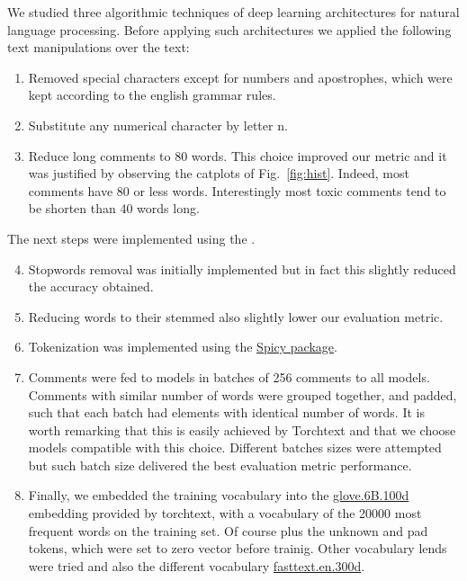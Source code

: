 \documentclass{report}
\begin{document}
We studied three algorithmic techniques of deep learning architectures for natural
language processing. Before applying such architectures we applied the following 
text manipulations over the text:
\begin{enumerate}
\item Removed special characters except for numbers and apostrophes, which
were kept according to the english grammar rules.
\item Substitute any numerical character by letter n.
\item Reduce long comments to 80 words. This choice improved our metric 
and it was justified by observing the catplots of Fig.~\ref{fig:hist}. Indeed, 
most comments have 80 or less words. Interestingly most toxic comments tend 
to be shorten than 40 words long.
\end{enumerate}
The next steps were implemented using the \cite{Torchtext}. 
\begin{enumerate}
 \setcounter{enumi}{3}
\item Stopwords removal was initially implemented but in fact this slightly reduced the
accuracy obtained. 
\item Reducing words to their stemmed also slightly lower our evaluation metric.
\item Tokenization was implemented using the \href{https://scipy.org/scipylib/}{Spicy package}.


\item Comments were fed to models in batches of 256 comments to all models. Comments
 with similar number of words were grouped together, and padded, such that 
each batch had elements with identical number of words. It is worth remarking that this is
easily achieved by Torchtext and that we choose models compatible with this choice. Different 
batches sizes were attempted but such batch size delivered the best evaluation metric performance. 

\item Finally, we embedded the training vocabulary into the 
\href{https://nlp.stanford.edu/projects/glove/}{glove.6B.100d} embedding 
provided by torchtext, with a vocabulary of the 20000 most frequent words on the
training set. Of course plus the unknown and pad tokens, which were set to zero vector before trainig. 
Other vocabulary lends were tried and also the different vocabulary \href{https://fasttext.cc/}{fasttext.en.300d}. 

\end{enumerate}
\end{document}
